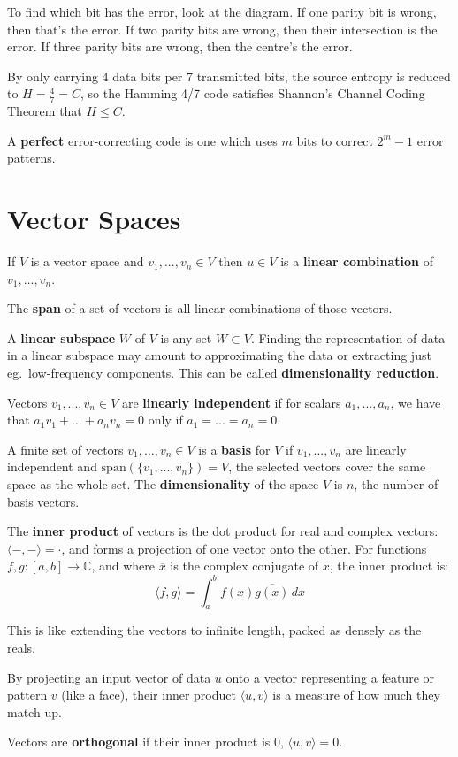 \documentclass[a4paper, 11pt]{article}
\begin{document}
{{        To find which bit has the error, look at the diagram. If one parity bit is wrong, then that's the error. If two parity bits are wrong, then their intersection is the error. If three parity bits are wrong, then the centre's the error.

        By only carrying 4 data bits per 7 transmitted bits, the source entropy is reduced to \(H = \frac{4}{7} = C\), so the Hamming 4/7 code satisfies Shannon's Channel Coding Theorem that \(H \leq C\).

        A \textbf{perfect} error-correcting code is one which uses \(m\) bits to correct \(2^m - 1\) error patterns.
    }
}
\section*{Vector Spaces}
{
    If \(V\) is a vector space and \(v_1,...,v_n \in V\) then \(u \in V\) is a \textbf{linear combination} of \(v_1,...,v_n\).

    The \textbf{span} of a set of vectors is all linear combinations of those vectors.

    A \textbf{linear subspace} \(W\) of \(V\) is any set \(W \subset V\). Finding the representation of data in a linear subspace may amount to approximating the data or extracting just eg.\ low-frequency components. This can be called \textbf{dimensionality reduction}.

    Vectors \(v_1,...,v_n \in V\) are \textbf{linearly independent} if for scalars \(a_1,...,a_n\), we have that \(a_1v_1 + ... + a_nv_n = 0\) only if \(a_1=...=a_n=0\).

    A finite set of vectors \(v_1,...,v_n \in V\) is a \textbf{basis} for \(V\) if \(v_1,...,v_n\) are linearly independent and \(\text{span}(\{v_1,...,v_n\}) = V\), the selected vectors cover the same space as the whole set. The \textbf{dimensionality} of the space \(V\) is \(n\), the number of basis vectors.

    The \textbf{inner product} of vectors is the dot product for real and complex vectors: \(\langle -,-\rangle = \cdot\), and forms a projection of one vector onto the other. For functions \(f,g : [a,b] \rightarrow \mathbb{C}\), and where \(\overline{x}\) is the complex conjugate of \(x\), the inner product is:
    \[\langle f,g \rangle = \int_a^b{f(x)\overline{g(x)}\,dx}\]

    This is like extending the vectors to infinite length, packed as densely as the reals.

    By projecting an input vector of data \(u\) onto a vector representing a feature or pattern \(v\) (like a face), their inner product \(\langle u,v \rangle\) is a measure of how much they match up.

    Vectors are \textbf{orthogonal} if their inner product is 0, \(\langle u,v \rangle = 0\).
}
\end{document}
